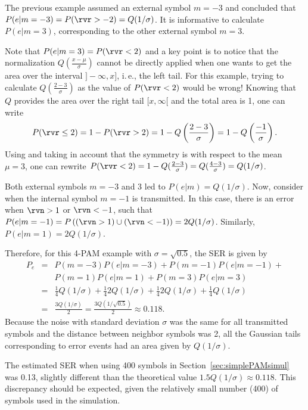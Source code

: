The previous example assumed an external symbol $m=-3$ and concluded that $P(e|m=-3)=P(\rvr > -2)=Q(1/\sigma)$. 
It is informative to calculate $P(e|m=3)$, corresponding to the other external symbol $m=3$. 

Note that 
$P(e|m=3) = P(\rvr < 2)$ and a key point is to notice that 
the normalization $Q\left( \frac{x - \mu}{\sigma}\right)$ cannot be directly applied when one wants to get the area over the interval $]-\infty,x]$, i.\,e., the left tail. For this example, trying to calculate $Q(\frac{2-3} {\sigma})$ as the value of $P(\rvr < 2)$ would be wrong! Knowing that $Q$ provides the area over the right tail $[x,\infty[$ and the total area is 1, one can write 
\[
P(\rvr \le 2) = 1-P(\rvr > 2) = 1-Q \left( \frac{2-3} {\sigma} \right) = 1-Q \left(\frac{-1} {\sigma} \right).
\]
Using  and taking in account that the symmetry is with respect to the mean $\mu=3$, one can rewrite $P(\rvr < 2) = 1-Q(\frac{2-3} {\sigma}) = Q(\frac{4-3} {\sigma}) = Q(1/\sigma)$.

Both external symbols $m=-3$ and 3 led to $P(e|m)=Q(1/\sigma)$. Now, consider when the internal symbol $m=-1$ is transmitted. In this case, there is an error when $\rvn>1$ or $\rvn<-1$, such that $P(e|m=-1) = P\left( (\rvn>1) \cup (\rvn<-1) \right) = 2Q(1/\sigma)$. Similarly, $P(e|m=1)=2Q(1/\sigma)$. 

Therefore, for this 4-PAM example with $\sigma=\sqrt{0.5}$, the SER is given by
\begin{eqnarray*}
P_e & = & P(m=-3)P(e|m=-3)+P(m=-1)P(e|m=-1)+ \\
& & P(m=1)P(e|m=1)+ P(m=3)P(e|m=3) \\
& = & \frac{1}{4} Q(1/\sigma) + \frac{1}{4} 2Q(1/\sigma) + \frac{1}{4} 2Q(1/\sigma) + \frac{1}{4} Q(1/\sigma) \\
& = & \frac{3Q(1/\sigma)}{2} = \frac{3Q(1/\sqrt{0.5})}{2} \approx 0.118.
\end{eqnarray*}
Because the noise with standard deviation $\sigma$ was the same for all transmitted symbols and the distance between neighbor symbols was 2, all the Gaussian tails corresponding to error events had an area given by $Q(1/\sigma)$. 

The estimated SER when using 400 symbols in Section~\ref{sec:simplePAMsimul} was 0.13, slightly different than the theoretical value $1.5Q(1/\sigma)\approx 0.118$. This discrepancy should be expected, given the relatively small number (400) of symbols used in the simulation.

